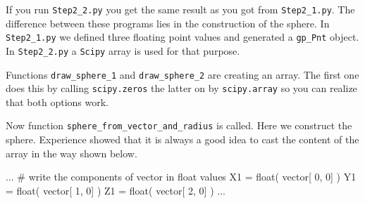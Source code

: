 If you run {\tt Step2\_2.py} you get the same result as you got from {\tt Step2\_1.py}.
The difference between these programs lies in the construction of the sphere.
In {\tt Step2\_1.py} we defined three floating point values and generated a {\tt \tt gp\_Pnt} object.
In {\tt Step2\_2.py} a {\tt Scipy} array is used for that purpose.

Functions {\tt draw\_sphere\_1} and  {\tt draw\_sphere\_2} are creating an array.
The first one does this by calling {\tt scipy.zeros} the latter on by {\tt scipy.array} so you can realize that both options work.

Now function {\tt sphere\_from\_vector\_and\_radius} is called.
Here we construct the sphere.
Experience showed that it is always a good idea to cast the content of the array in the way shown below.
\begin{python}
...    
    # write the components of vector in float values
    X1 = float( vector[ 0, 0] )
    Y1 = float( vector[ 1, 0] )
    Z1 = float( vector[ 2, 0] )
...    
\end{python}
